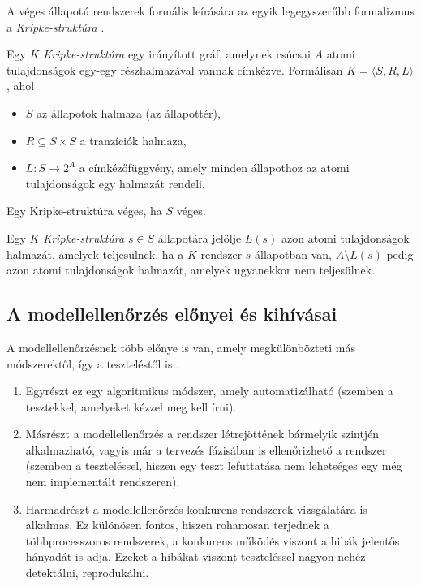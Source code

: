 A véges állapotú rendszerek formális leírására az egyik legegyszerűbb formalizmus a \emph{Kripke-struktúra} \cite{IntroductionToModelChecking}.

\begin{definition}
Egy $K$ \emph{Kripke-struktúra} egy irányított gráf, amelynek csúcsai $A$ atomi tulajdonságok egy-egy részhalmazával vannak címkézve. Formálisan $K = \langle S, R, L \rangle$, ahol
\begin{itemize}
    \item $S$ az állapotok halmaza (az állapottér),
    \item $R \subseteq S \times S$ a tranzíciók halmaza,
    \item $L: S \rightarrow 2^A$ a címkézőfüggvény, amely minden állapothoz az atomi tulajdonságok egy halmazát rendeli.
\end{itemize}
Egy Kripke-struktúra véges, ha $S$ véges.
\end{definition}

Egy $K$ \emph{Kripke-struktúra} $s \in S$ állapotára jelölje $L(s)$ azon atomi tulajdonságok halmazát, amelyek teljesülnek, ha a $K$ rendszer $s$ állapotban van, $A \setminus L(s)$ pedig azon atomi tulajdonságok halmazát, amelyek ugyanekkor nem teljesülnek.


\subsection{A modellellenőrzés előnyei és kihívásai}

A modellellenőrzésnek több előnye is van, amely megkülönbözteti más módszerektől, így a teszteléstől is \cite{IntroductionToModelChecking}.
\begin{enumerate}
    \item Egyrészt ez egy algoritmikus módszer, amely automatizálható (szemben a tesztekkel, amelyeket kézzel meg kell írni).
    \item Másrészt a modellellenőrzés a rendszer létrejöttének bármelyik szintjén alkalmazható, vagyis már a tervezés fázisában is ellenőrizhető a rendszer (szemben a teszteléssel, hiszen egy teszt lefuttatása nem lehetséges egy még nem implementált rendszeren).
    \item Harmadrészt a modellellenőrzés konkurens rendszerek vizsgálatára is alkalmas. Ez különösen fontos, hiszen rohamosan terjednek a többprocesszoros rendszerek, a konkurens működés viszont a hibák jelentős hányadát is adja. Ezeket a hibákat viszont teszteléssel nagyon nehéz detektálni, reprodukálni.
\end{enumerate}

